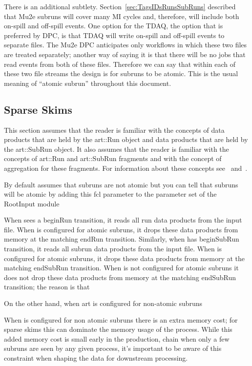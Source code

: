 There is an additional subtlety.
Section~\ref{sec:TagsIDsRunsSubRuns} described that Mu2e subruns will cover many MI cycles
and, therefore, will include both on-spill and off-spill events.
One option for the TDAQ, the option that is preferred by DPC,
is that TDAQ will write on-spill and off-spill events to separate files.
The Mu2e DPC anticipates only workflows in which these two files are treated separately;
another way of saying it is that there will be no jobs that read events from both of these files.
Therefore we can say that within each of these two file streams the design is for subruns to be atomic.
This is the usual meaning of ``atomic subrun'' throughout this document.

\subsection{Sparse Skims}

This section assumes that the reader is familiar with the \art concepts
of data products that are held by the {\code art::Run} object
and data products that are held by the {\code art::SubRun} object.
It also assumes that the reader is familiar with the \art concepts
of {\code art::Run} and {\code art::SubRun} fragments
and with the concept of aggregation for these fragments.
For information about these concepts see~\cite{RunAndSubRunProducts}
and~\cite{ProductAggregation}.


By default \art assumes that subruns are not atomic
but you can tell \art that subruns will be atomic by adding this fcl
parameter to the parameter set of the RootInput module


When \art sees a beginRun transition, it reads all run data products from the input file.
When \art is configured for atomic subruns, it drops these data products
from memory at the matching endRun transition.
Similarly, when \art has beginSubRun transition, it reads all subrun data products from the input file.
When \art is configured for atomic subruns, it drops these data products
from memory at the matching endSubRun transition.
When \art is not configured for atomic subruns it does not drop these data products from
memory at the matching endSubRun transition; the reason is that 

On the other hand, when art is configured for non-atomic subruns

When \art is configured for non atomic subruns there is an extra memory cost;
for sparse skims this can dominate the memory usage of the process.
While this added memory cost is small early in the production, chain when
only a few subruns are seen by any given process, it's important to be
aware of this constraint when shaping the data for downstream processing.

